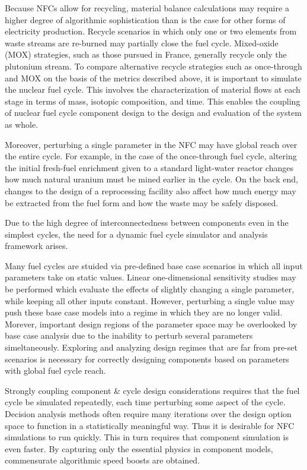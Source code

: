 Because NFCs allow for recycling, material balance calculations may require a higher degree of
algorithmic sophistication than is the case for other forms of electricity production.  
Recycle scenarios in which only one or two 
elements from waste streams are re-burned may partially close the fuel cycle.  
Mixed-oxide (MOX) strategies, such as those pursued in France, 
generally recycle only the plutonium stream.  
To compare alternative recycle strategies such as once-through and MOX on the basis of the metrics 
described above, it is important to simulate the nuclear fuel cycle.  
This involves the characterization 
of material flows at each stage in terms of mass, isotopic composition, and time.  This enables 
the coupling of nuclear fuel cycle component design to the design and evaluation of the system as whole.  

Moreover, perturbing a single parameter in the NFC may have global reach over the entire cycle.
For example, in the case of the once-through fuel cycle, altering the initial fresh-fuel 
 enrichment given to a standard light-water reactor changes how much natural 
uranium must be mined earlier in the cycle.  On the back end, changes to the design of 
a reprocessing facility also affect 
how much energy may be extracted from the fuel form and how the waste may be safely disposed.

Due to the high degree of interconnectedness between components 
even in the simplest cycles, the need for a dynamic 
fuel cycle simulator and analysis framework arises.  

Many fuel cycles are stuided via pre-defined base case scenarios in which all input parameters
take on static values.  Linear one-dimensional sensitivity studies may be performed which evaluate
the effects of slightly changing a single parameter, while keeping all other inputs
constant.  However, perturbing a single value may push these base case models into a regime in which 
they are no longer valid.  Morever, important design regions of the parameter space may be 
overlooked by base case analysis due to the inability to perturb several parameters
simeltaneously.  
Exploring and analyzing design regimes that are far from pre-set scenarios is necessary for 
correctly designing components based on parameters with global fuel cycle reach.

Strongly coupling component \& cycle design considerations requires that the fuel cycle be 
simulated repeatedly, each time perturbing some aspect of the cycle.  
Decision analysis methods often require many iterations over the design option space
to function in a statistically meaningful way.
Thus it is desirable for
NFC simulations to run quickly.  This in turn requires that component simulation is even faster. 
By capturing only the essential physics in component models, commensurate algorithmic speed 
boosts are obtained.

